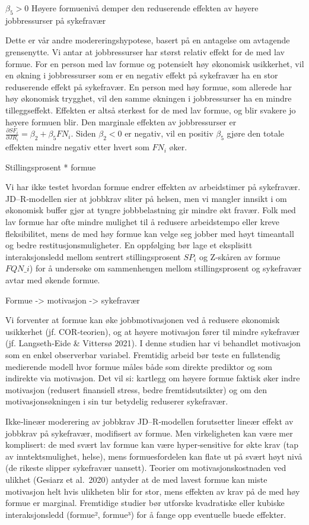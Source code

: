 \documentclass[
  12pt,
  a4paper,
  DIV=11,
  numbers=noendperiod]{scrartcl}
\begin{document}
\(\beta_5 > 0\) Høyere formuenivå demper den reduserende effekten av
høyere jobbressurser på sykefravær

Dette er vår andre modereringshypotese, basert på en antagelse om
avtagende grensenytte. Vi antar at jobbressurser har størst relativ
effekt for de med lav formue. For en person med lav formue og potensielt
høy økonomisk usikkerhet, vil en økning i jobbressurser som er en
negativ effekt på sykefravær ha en stor reduserende effekt på
sykefravær. En person med høy formue, som allerede har høy økonomisk
trygghet, vil den samme økningen i jobbressurser ha en mindre
tilleggseffekt. Effekten er altså sterkest for de med lav formue, og
blir svakere jo høyere formuen blir. Den marginale effekten av
jobbressurser er
\(\frac{\partial SF_i}{\partial JR_i} = \beta_2 + \beta_5 FN_i\). Siden
\(\beta_2 < 0\) er negativ, vil en positiv \(\beta_5\) gjøre den totale
effekten mindre negativ etter hvert som \(FN_i\) øker.

Stillingsprosent * formue

Vi har ikke testet hvordan formue endrer effekten av arbeidstimer på
sykefravær. JD--R‐modellen sier at jobbkrav sliter på helsen, men vi
mangler innsikt i om økonomisk buffer gjør at tyngre jobbbelastning gir
mindre økt fravær. Folk med lav formue har ofte mindre mulighet til å
redusere arbeidstempo eller kreve fleksibilitet, mens de med høy formue
kan velge seg jobber med høyt timeantall og bedre
restitusjonsmuligheter. En oppfølging bør lage et eksplisitt
interaksjonsledd mellom sentrert stillingsprosent \(SP_i\) og Z‐skåren
av formue \(FQN\_i\)) for å undersøke om sammenhengen mellom
stillingsprosent og sykefravær avtar med økende formue.

Formue -\textgreater{} motivasjon -\textgreater{} sykefravær

Vi forventer at formue kan øke jobbmotivasjonen ved å redusere økonomisk
usikkerhet (jf. COR‐teorien), og at høyere motivasjon fører til mindre
sykefravær (jf. Langseth‐Eide \& Vittersø 2021). I denne studien har vi
behandlet motivasjon som en enkel observerbar variabel. Fremtidig arbeid
bør teste en fullstendig medierende modell hvor formue måles både som
direkte prediktor og som indirekte via motivasjon. Det vil si: kartlegg
om høyere formue faktisk øker indre motivasjon (redusert finansiell
stress, bedre fremtidsutsikter) og om den motivasjonsøkningen i sin tur
betydelig reduserer sykefravær.

Ikke‐lineær moderering av jobbkrav JD--R‐modellen forutsetter lineær
effekt av jobbkrav på sykefravær, modifisert av formue. Men
virkeligheten kan være mer komplisert: de med svært lav formue kan være
hyper‐sensitive for økte krav (tap av inntektsmulighet, helse), mens
formuesfordelen kan flate ut på svært høyt nivå (de rikeste slipper
sykefravær uansett). Teorier om motivasjonskostnaden ved ulikhet
(Gesiarz et al.~2020) antyder at de med lavest formue kan miste
motivasjon helt hvis ulikheten blir for stor, mens effekten av krav på
de med høy formue er marginal. Fremtidige studier bør utforske
kvadratiske eller kubiske interaksjonsledd (formue², formue³) for å
fange opp eventuelle buede effekter.
\end{document}

